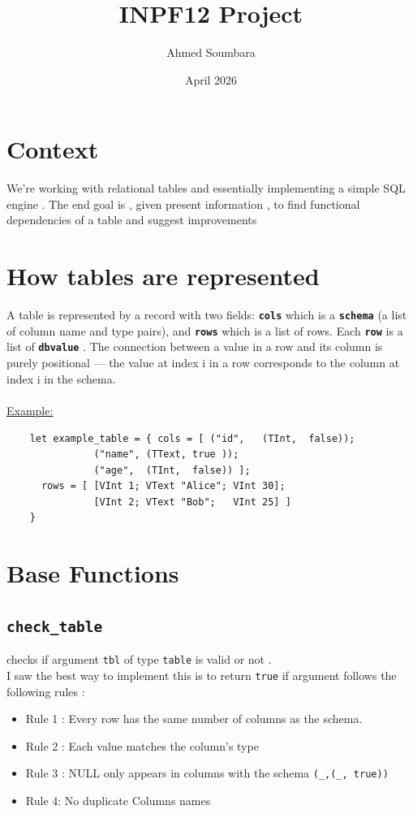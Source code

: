 \documentclass[11pt]{article}
\title{INPF12 Project}
\author{Ahmed Soumbara }
\date{April 2026}
\begin{document}
\maketitle
\tableofcontents
\newpage

\section{Context}
We're working  with relational tables and essentially implementing a simple SQL engine . The end goal is , given present information , to find functional dependencies of a table and suggest improvements

\section{How tables are represented}
A table is represented by a record with two fields: \textbf{\texttt{cols}} which is a \textbf{\texttt{schema}} (a list of column name and type pairs), and \textbf{\texttt{rows}} which is a list of rows. Each \textbf{\texttt{row}} is a list of \textbf{\texttt{dbvalue}} . The connection between a value in a row and its column is purely positional — the value at index i in a row corresponds to the column at index i in the schema.\\
\\
\underline{Example:}
\begin{lstlisting}
    let example_table = { cols = [ ("id",   (TInt,  false));
               ("name", (TText, true ));
               ("age",  (TInt,  false)) ];
      rows = [ [VInt 1; VText "Alice"; VInt 30];
               [VInt 2; VText "Bob";   VInt 25] ]
    }
\end{lstlisting}

\section{Base Functions}
\subsection{\texttt{check\_table}}
checks if argument \texttt{tbl} of type \texttt{table} is valid or not . \\

I saw the best way to implement this is to return \texttt{true} if argument follows the following rules :

\begin{itemize}
    \item Rule 1 : Every row has the same number of columns as the schema. 
    \item Rule 2 :  Each value matches the column's type
    \item Rule 3 :  NULL only appears in columns with the schema \texttt{(\_,(\_, true))}
    \item Rule 4: No duplicate Columns names
\end{itemize}
\end{document}
